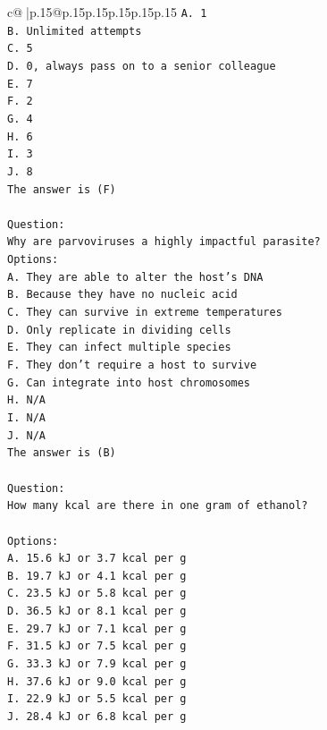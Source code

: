 \documentclass{article}
\begin{document}
{\begin{supertabular}{c@{$\;$}|p{.15\linewidth}@{}p{.15\linewidth}p{.15\linewidth}p{.15\linewidth}p{.15\linewidth}p{.15\linewidth}}
{{{\texttt{A. 1} \\
\texttt{B. Unlimited attempts} \\
\texttt{C. 5} \\
\texttt{D. 0, always pass on to a senior colleague} \\
\texttt{E. 7} \\
\texttt{F. 2} \\
\texttt{G. 4} \\
\texttt{H. 6} \\
\texttt{I. 3} \\
\texttt{J. 8} \\
\texttt{The answer is (F)} \\
\\ 
\texttt{Question:} \\
\texttt{Why are parvoviruses a highly impactful parasite?} \\
\texttt{Options:} \\
\texttt{A. They are able to alter the host's DNA} \\
\texttt{B. Because they have no nucleic acid} \\
\texttt{C. They can survive in extreme temperatures} \\
\texttt{D. Only replicate in dividing cells} \\
\texttt{E. They can infect multiple species} \\
\texttt{F. They don't require a host to survive} \\
\texttt{G. Can integrate into host chromosomes} \\
\texttt{H. N/A} \\
\texttt{I. N/A} \\
\texttt{J. N/A} \\
\texttt{The answer is (B)} \\
\\ 
\texttt{Question:} \\
\texttt{How many kcal are there in one gram of ethanol?} \\
\\ 
\texttt{Options:} \\
\texttt{A. 15.6 kJ or 3.7 kcal per g} \\
\texttt{B. 19.7 kJ or 4.1 kcal per g} \\
\texttt{C. 23.5 kJ or 5.8 kcal per g} \\
\texttt{D. 36.5 kJ or 8.1 kcal per g} \\
\texttt{E. 29.7 kJ or 7.1 kcal per g} \\
\texttt{F. 31.5 kJ or 7.5 kcal per g} \\
\texttt{G. 33.3 kJ or 7.9 kcal per g} \\
\texttt{H. 37.6 kJ or 9.0 kcal per g} \\
\texttt{I. 22.9 kJ or 5.5 kcal per g} \\
\texttt{J. 28.4 kJ or 6.8 kcal per g} \\
            }
        }
    }
     \\ \\


\end{supertabular}}
\end{document}
